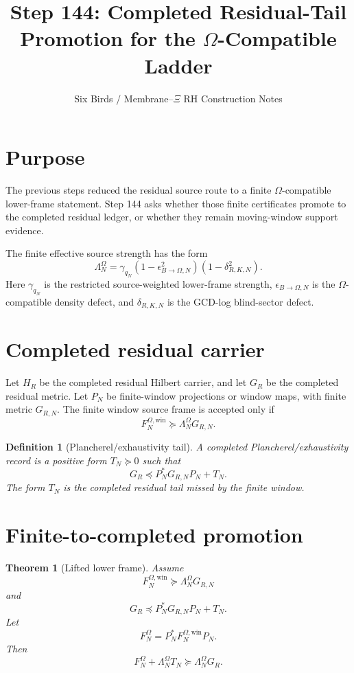 \documentclass[11pt]{article}
\title{Step 144: Completed Residual-Tail Promotion for the \texorpdfstring{$\Omega$}{Omega}-Compatible Ladder}
\author{Six Birds / Membrane--\texorpdfstring{$\Xi$}{Xi} RH Construction Notes}
\date{}
\newtheorem{theorem}{Theorem}
\newtheorem{definition}{Definition}
\begin{document}
\maketitle

\section{Purpose}
The previous steps reduced the residual source route to a finite \(\Omega\)-compatible lower-frame statement.  Step 144 asks whether those finite certificates promote to the completed residual ledger, or whether they remain moving-window support evidence.

The finite effective source strength has the form
\begin{equation}
\Lambda_N^\Omega
=
\gamma_{q_N}
(1-\epsilon_{B\to\Omega,N}^{2})
(1-\delta_{R,K,N}^{2}).
\end{equation}
Here \(\gamma_{q_N}\) is the restricted source-weighted lower-frame strength, \(\epsilon_{B\to\Omega,N}\) is the \(\Omega\)-compatible density defect, and \(\delta_{R,K,N}\) is the GCD-log blind-sector defect.

\section{Completed residual carrier}
Let \(H_R\) be the completed residual Hilbert carrier, and let \(G_R\) be the completed residual metric.  Let \(P_N\) be finite-window projections or window maps, with finite metric \(G_{R,N}\).  The finite window source frame is accepted only if
\begin{equation}
F_N^{\Omega,\mathrm{win}}\succeq \Lambda_N^\Omega G_{R,N}.
\end{equation}

\begin{definition}[Plancherel/exhaustivity tail]
A completed Plancherel/exhaustivity record is a positive form \(T_N\succeq0\) such that
\begin{equation}
G_R\preceq P_N^*G_{R,N}P_N+T_N.
\end{equation}
The form \(T_N\) is the completed residual tail missed by the finite window.
\end{definition}

\section{Finite-to-completed promotion}
\begin{theorem}[Lifted lower frame]
Assume
\[
F_N^{\Omega,\mathrm{win}}\succeq \Lambda_N^\Omega G_{R,N}
\]
and
\[
G_R\preceq P_N^*G_{R,N}P_N+T_N.
\]
Let
\[
F_N^\Omega=P_N^*F_N^{\Omega,\mathrm{win}}P_N.
\]
Then
\begin{equation}
F_N^\Omega+\Lambda_N^\Omega T_N\succeq \Lambda_N^\Omega G_R.
\end{equation}
\end{theorem}
\end{document}
